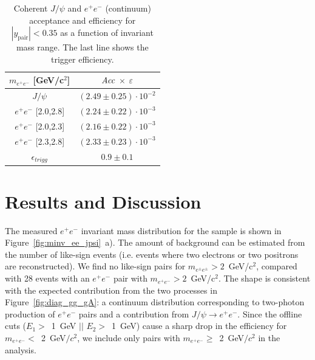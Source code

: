 \documentclass[dvipdfm]{elsart}
\def\fig#1{{Figure~\ref{#1}}}
\providecommand{\jpsi}{J/\psi}
\begin{document}
\begin{table}[tbh]
  \caption{
    \label{tab:efficiencies}
Coherent $\jpsi$ and $e^+e^-$ (continuum) acceptance and efficiency for 
$|y_\mathrm{pair}|<0.35$ as a function of invariant mass range. 
The last line shows the trigger efficiency.
  }
  \begin{center}
    \begin{tabular}{cc}
      \noalign{\smallskip}\hline\hline 
      $m_{e^+e^-}$ [GeV/c$^2$] & $\ensuremath{{\it Acc}}$ $\times$ $\varepsilon$ 
      \\  \hline\hline 
      $\jpsi$  & $ ( 2.49 \pm 0.25) \cdot 10^{-2} $
      \\
      $e^+e^- $ \mbox{[2.0,2.8]} & $ ( 2.24 \pm 0.22) \cdot 10^{-3} $ 
      \\
      $e^+e^- $ \mbox{[2.0,2.3]} & $ ( 2.16 \pm 0.22 ) \cdot 10^{-3} $ 
      \\
      $e^+e^- $ \mbox{[2.3,2.8]} & $ ( 2.33 \pm 0.23 ) \cdot 10^{-3} $ 
      \\ \hline 
      $\epsilon_{trigg}$           & $0.9 \pm 0.1$
      \\  \hline\hline 
    \end{tabular}
  \end{center}
\end{table}

\section{Results and Discussion}
\label{section:results}

The measured $e^+ e^-$ invariant mass distribution for the sample is shown in 
\fig{fig:minv_ee_jpsi}~a). The amount of background can be estimated from the 
number of like-sign events (i.e. events where two electrons or two positrons 
are reconstructed). We find no like-sign pairs for 
$m_{e^{\pm}e^{\pm}}>2$~GeV/c$^2$, compared with 28 events with an $e^+ e^-$ 
pair with $m_{e^+e^-}>2$~GeV/c$^2$. The shape is consistent with the expected 
contribution from the two processes in \fig{fig:diag_gg_gA}: a continuum 
distribution corresponding to two-photon production of $e^+ e^-$ pairs and a 
contribution from $\jpsi \rightarrow e^+ e^-$. Since the offline cuts ($E_1 
>$~1~GeV $||$ $E_2 >$~1~GeV) cause a sharp drop in the efficiency for 
$m_{e^+e^-} <$~2~GeV$/c^2$, we include only pairs with $m_{e^+e^-} 
\geq$~2~GeV$/c^2$ in the analysis.
\end{document}
